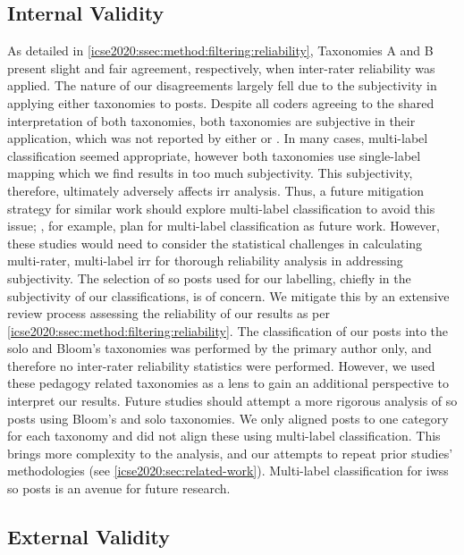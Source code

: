 \subsection{Internal Validity}
%
As detailed in \cref{icse2020:ssec:method:filtering:reliability}, Taxonomies A and B present slight and fair agreement, respectively, when inter-rater reliability was applied. The nature of our disagreements largely fell due to the subjectivity in applying either taxonomies to posts. Despite all coders agreeing to the shared interpretation of both taxonomies, both taxonomies are subjective in their application, which was not reported by either \citeauthor{Aghajani:2019bo} or \citeauthor{Beyer:2018fm}. In many cases, multi-label classification seemed appropriate, however both taxonomies use single-label mapping which we find results in too much subjectivity. This subjectivity, therefore, ultimately adversely affects \gls{irr} analysis. Thus, a future mitigation strategy for similar work should explore multi-label classification to avoid this issue; \citeauthor{Beyer:2018fm}, for example, plan for multi-label classification as future work. However, these studies would need to consider the statistical challenges in calculating multi-rater, multi-label \gls{irr} for thorough reliability analysis in addressing subjectivity.
%
The selection of \gls{so} posts used for our labelling, chiefly in the subjectivity of our classifications, is of concern. We mitigate this by an extensive review process assessing the reliability of our results as per \cref{icse2020:ssec:method:filtering:reliability}.
%
The classification of our posts into the \gls{solo} and Bloom's taxonomies was performed by the primary author only, and therefore no inter-rater reliability statistics were performed. However, we used these pedagogy related taxonomies as a lens to gain an additional perspective to interpret our results. Future studies should attempt a more rigorous analysis of \gls{so} posts using Bloom's and \gls{solo} taxonomies.
%
We only aligned posts to one category for each taxonomy and did not align these using multi-label classification. This brings more complexity to the analysis, and our attempts to repeat prior studies' methodologies (see \cref{icse2020:sec:related-work}). Multi-label classification for \glspl{iws} \gls{so} posts is an avenue for future research.

%
\subsection{External Validity}

